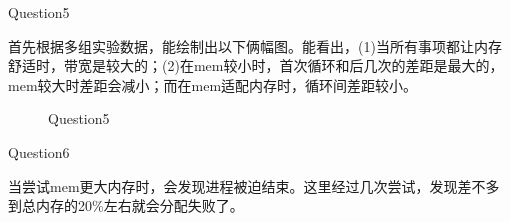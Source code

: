 \documentclass[12pt]{article}
\begin{document}
\begin{large}
	\noindent Question5\\
\end{large}
\hspace*{2em}首先根据多组实验数据，能绘制出以下俩幅图。能看出，(1)当所有事项都让内存舒适时，带宽是较大的；(2)在mem较小时，首次循环和后几次的差距是最大的，mem较大时差距会减小；而在mem适配内存时，循环间差距较小。
\newpage
\begin{figure}[!h]
    \centering
    \hfill
	\caption{Question5}
\end{figure}

\begin{large}
	\noindent Question6\\
\end{large}
\hspace*{2em}当尝试mem更大内存时，会发现进程被迫结束。这里经过几次尝试，发现差不多到总内存的20\%左右就会分配失败了。\\
\end{document}
